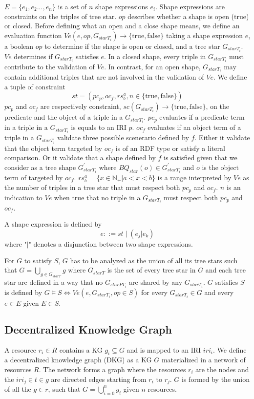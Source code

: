 $E = \{e_1, e_2 ..., e_{n}\}$ is a set of $n$ shape expressions $e_i$.
Shape expressions are constraints on the triples of tree star.
$op$ describes whether a shape is open ($\mathrm{true}$) or closed.
Before defining what an open and a close shape means, we define an evaluation function 
$Ve(e, op, G_{starT_i}) \rightarrow \{\mathrm{true}, \mathrm{false} \}$
taking a shape expression $e$, a boolean $op$ to determine if the shape is open or closed, and a tree star $G_{starT_i}$.
$Ve$ determines if $G_{starT_i}$ satisfies $e$.
In a closed shape, every triple in $G_{starT_i}$ must contribute to the validation of $Ve$.
In contrast, for an open shape, $G_{starT_i}$ may contain additional triples that are not involved in the validation of $Ve$.
We define a tuple of constraint
\begin{equation}
    st = (pc_p, oc_f, rs^a_b, n \in \{\mathrm{true}, \mathrm{false}\})
\end{equation}
$pc_p$ and $oc_f$ are respectively constraint,
$sc(G_{starT_i})  \rightarrow \{\mathrm{true}, \mathrm{false}\}$,
on the predicate and the object of a triple in a $G_{starT_i}$.
$pc_p$ evaluates if a predicate term in a triple in a $G_{starT_i}$ is equals to an IRI $p$.
$oc_f$ evaluates if an object term of a triple in a $G_{starT_i}$ validate three possible scenerario defined by $f$.
Either it validate that the object term targeted by $oc_f$ is of an RDF type or satisfy a literal comparison.
Or it validate that a shape defined by $f$ is satisfied given that we consider as a tree shape 
$G_{starT_i}^{\prime}$ where $BQ_{star}(o) \in G_{starT_i}^{\prime}$ and $o$ is the object term of targeted by $oc_f$.
$rs^a_b = \{x \in \mathbb{N}_+ | a < x < b \}$ is a range interpreted by $Ve$ as the number of triples in a tree star that must respect both $pc_p$ and $oc_f$.
$n$ is an indication to $Ve$ when $\mathrm{true}$ that no triple in a $G_{starT_i}$ must respect both $pc_p$ and $oc_f$. 

A shape expression is defined by
\begin{equation}
 e ::= st \mid (e_j|e_k)
\end{equation}
where "$|$" denotes a disjunction between two shape expressions.

For $G$ to satisfy $S$, $G$ has to be analyzed as the union of all its tree stars such that $G = \bigcup_{g \in G_{starT}} g$ where $G_{starT}$ is the set of every tree star in $G$
and each tree star are defined in a way that no $G_{starPT_i}$ are shared by any $G_{starT_i}$.
$G$ satisfies $S$ is defined by $G \models S \iff Ve(e,G_{starT_i}, op\in S)$  for every $G_{starT_i} \in G$ and every $e \in E$ given $E \in S$.

\subsection{Decentralized Knowledge Graph}
A resource $r_i \in R$ contains a KG $g_i \subseteq G$ and is mapped to an IRI $iri_i$.
We define a decentralized knowledge graph (DKG) as a KG $G$ materialized in a network of resources $R$.
The network forms a graph where the resources $r_i$ are the nodes and the $iri_j \in t \in g$ are directed edges starting from $r_i$ to $r_j$.
$G$ is formed by the union of all the $g \in r$, such that $G = \bigcup_{i=0}^{n}g_i$ given $n$ resources.